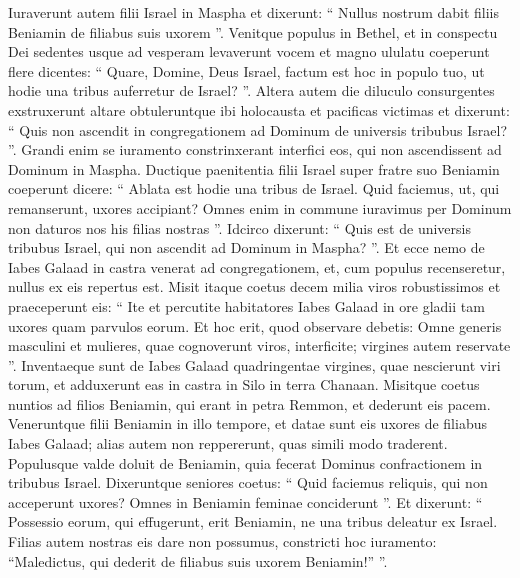 \begin{biblechapter}
\begin{biblechapter}
\begin{biblechapter}
\begin{biblechapter}
\begin{biblechapter}
\begin{biblechapter}
\begin{biblechapter}
\begin{biblechapter}
\begin{biblechapter}
\begin{biblechapter}
\begin{biblechapter}
\begin{biblechapter}
\begin{biblechapter}
\begin{biblechapter}
\begin{biblechapter}
\begin{biblechapter}
\begin{biblechapter}
\begin{biblechapter}
\begin{biblechapter}
\begin{biblechapter}
\begin{biblechapter}
\verse Iuraverunt autem filii Israel in Maspha et dixerunt: “ Nullus nostrum dabit filiis Beniamin de filiabus suis uxorem ”.
 \verse Venitque populus in Bethel, et in conspectu Dei sedentes usque ad vesperam levaverunt vocem et magno ululatu coeperunt flere dicentes: 
\verse “ Quare, Domine, Deus Israel, factum est hoc in populo tuo, ut hodie una tribus auferretur de Israel? ”. 
\verse Altera autem die diluculo consurgentes exstruxerunt altare obtuleruntque ibi holocausta et pacificas victimas 
\verse et dixerunt: “ Quis non ascendit in congregationem ad Dominum de universis tribubus Israel? ”. Grandi enim se iuramento constrinxerant interfici eos, qui non ascendissent ad Dominum in Maspha.
 \verse Ductique paenitentia filii Israel super fratre suo Beniamin coeperunt dicere: “ Ablata est hodie una tribus de Israel. 
\verse Quid faciemus, ut, qui remanserunt, uxores accipiant? Omnes enim in commune iuravimus per Dominum non daturos nos his filias nostras ”. 
\verse Idcirco dixerunt: “ Quis est de universis tribubus Israel, qui non ascendit ad Dominum in Maspha? ”. Et ecce nemo de Iabes Galaad in castra venerat ad congregationem, 
\verse et, cum populus recenseretur, nullus ex eis repertus est. 
\verse Misit itaque coetus decem milia viros robustissimos et praeceperunt eis: “ Ite et percutite habitatores Iabes Galaad in ore gladii tam uxores quam parvulos eorum. 
\verse Et hoc erit, quod observare debetis: Omne generis masculini et mulieres, quae cognoverunt viros, interficite; virgines autem reservate ”. 
\verse Inventaeque sunt de Iabes Galaad quadringentae virgines, quae nescierunt viri torum, et adduxerunt eas in castra in Silo in terra Chanaan.
 \verse Misitque coetus nuntios ad filios Beniamin, qui erant in petra Remmon, et dederunt eis pacem. 
\verse Veneruntque filii Beniamin in illo tempore, et datae sunt eis uxores de filiabus Iabes Galaad; alias autem non reppererunt, quas simili modo traderent.
 \verse Populusque valde doluit de Beniamin, quia fecerat Dominus confractionem in tribubus Israel. 
\verse Dixeruntque seniores coetus: “ Quid faciemus reliquis, qui non acceperunt uxores? Omnes in Beniamin feminae conciderunt ”. 
\verse Et dixerunt: “ Possessio eorum, qui effugerunt, erit Beniamin, ne una tribus deleatur ex Israel. 
\verse Filias autem nostras eis dare non possumus, constricti hoc iuramento: “Maledictus, qui dederit de filiabus suis uxorem Beniamin!” ”. 

\end{biblechapter}
\end{biblechapter}
\end{biblechapter}
\end{biblechapter}
\end{biblechapter}
\end{biblechapter}
\end{biblechapter}
\end{biblechapter}
\end{biblechapter}
\end{biblechapter}
\end{biblechapter}
\end{biblechapter}
\end{biblechapter}
\end{biblechapter}
\end{biblechapter}
\end{biblechapter}
\end{biblechapter}
\end{biblechapter}
\end{biblechapter}
\end{biblechapter}
\end{biblechapter}
